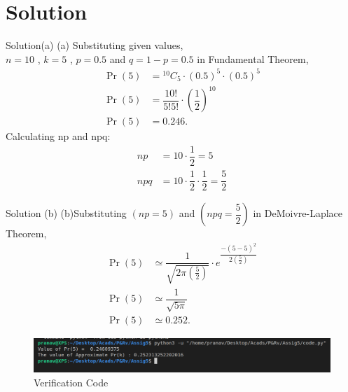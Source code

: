 \documentclass{beamer}
\providecommand{\pr}[1]{\ensuremath{\Pr\left(#1\right)}}
\newcommand*{\Comb}[2]{{}^{#1}C_{#2}}
\begin{document}
    \section{Solution}
        \begin{frame}{Solution(a)}
       (a) Substituting given values,\\ $n=10$ , $k=5$ , $p=0.5$ and $q=1-p=0.5$ in Fundamental Theorem,\\[9pt]
         \begin{align*}
         \pr{5} &= \Comb{10}{5} \cdot (0.5)^5 \cdot (0.5)^5 \\
         \pr{5} &= \dfrac{10!}{5!5!} \cdot (\dfrac{1}{2})^{10}\\
         \pr{5} &= 0.246.
         \end{align*}
         Calculating np and npq:
         \begin{align*}
         np &= 10 \cdot \dfrac{1}{2}=5\\
         npq &= 10 \cdot \dfrac{1}{2} \cdot \dfrac{1}{2} = \dfrac{5}{2}
         \end{align*}
    \end{frame}
    \begin{frame}{Solution (b)}
    (b)Substituting $(np = 5)$ and $(npq = \dfrac{5}{2})$ in DeMoivre-Laplace Theorem,\\[9pt]
    \begin{align*}
    \pr{5} &\simeq \dfrac{1}{\sqrt{2\pi(\frac{5}{2})}} \cdot e^{\dfrac{-(5-5)^2}{2(\frac{5}{2})}} \\
    \pr{5} &\simeq \dfrac{1}{\sqrt{5\pi}}\\
    \pr{5} &\simeq 0.252.
    \end{align*}
    \end{frame}
    \begin{frame}
    \begin{figure}[H]
		\centering
			\includegraphics[width=\columnwidth]{figs/output1.png}
			\caption{Verification Code}
			\label{Fig1}	
	\end{figure}
    \end{frame}
\end{document}
